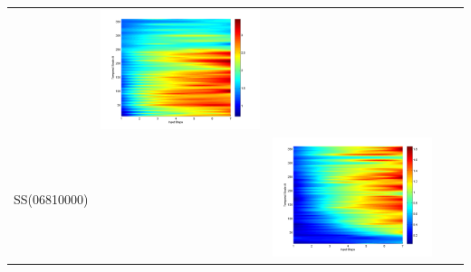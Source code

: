 \documentclass[11pt]{article}
\begin{document}
\begin{table}[H]
{\begin{tabular}{ccccc}
&\begin{minipage}{.3\textwidth}\includegraphics[width=\linewidth]{resultgraph/11532500pepq.png}\end{minipage}
\\
\multirow{8}{*}{SS(06810000)}&
&\begin{minipage}{.3\textwidth}\includegraphics[width=\linewidth]{resultgraph/06810000p.png}\end{minipage}

\end{tabular}}
\end{table}
\end{document}
